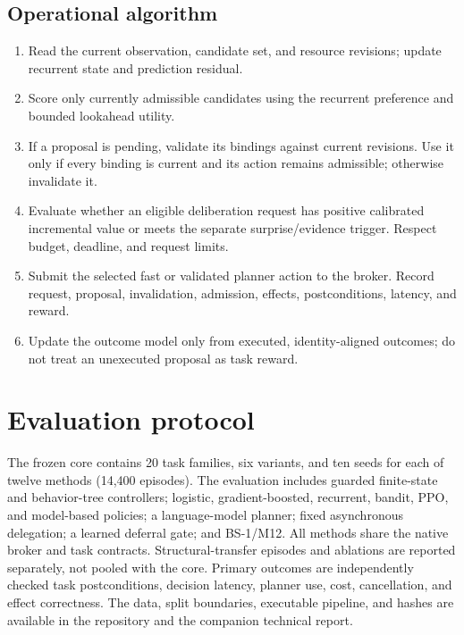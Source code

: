 \documentclass[11pt]{article}
\begin{document}
\subsection{Operational algorithm}
\begin{enumerate}[leftmargin=*]
\item Read the current observation, candidate set, and resource revisions; update recurrent state and prediction residual.
\item Score only currently admissible candidates using the recurrent preference and bounded lookahead utility.
\item If a proposal is pending, validate its bindings against current revisions. Use it only if every binding is current and its action remains admissible; otherwise invalidate it.
\item Evaluate whether an eligible deliberation request has positive calibrated incremental value or meets the separate surprise/evidence trigger. Respect budget, deadline, and request limits.
\item Submit the selected fast or validated planner action to the broker. Record request, proposal, invalidation, admission, effects, postconditions, latency, and reward.
\item Update the outcome model only from executed, identity-aligned outcomes; do not treat an unexecuted proposal as task reward.
\end{enumerate}

\section{Evaluation protocol}
The frozen core contains 20 task families, six variants, and ten seeds for each of twelve methods (14,400 episodes). The evaluation includes guarded finite-state and behavior-tree controllers; logistic, gradient-boosted, recurrent, bandit, PPO, and model-based policies; a language-model planner; fixed asynchronous delegation; a learned deferral gate; and BS-1/M12. All methods share the native broker and task contracts. Structural-transfer episodes and ablations are reported separately, not pooled with the core. Primary outcomes are independently checked task postconditions, decision latency, planner use, cost, cancellation, and effect correctness. The data, split boundaries, executable pipeline, and hashes are available in the repository and the companion technical report.
\end{document}
